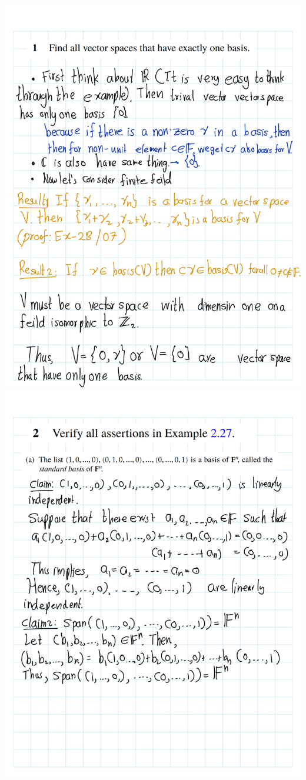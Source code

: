 \documentclass[
]{book}
\theoremstyle{definition}
\theoremstyle{definition}
\theoremstyle{definition}
\theoremstyle{definition}
\theoremstyle{remark}
\begin{document}
\includegraphics{fig/Ex 2B and 2C/EX2B (3).png}
\includegraphics{fig/Ex 2B and 2C/EX2B (4).png}
\end{document}
